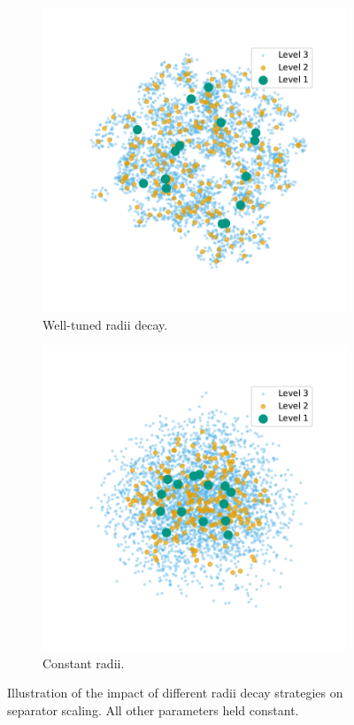 \begin{figure}[tbhp]
\begin{subfigure}{0.3\linewidth}
		\includegraphics[width=\linewidth]{graphics/good.pdf}
		\caption{Well-tuned radii decay.}
		\label{fig:radius_good}
	\end{subfigure}
	\hfill
	\begin{subfigure}{0.3\linewidth}
		\centering
		\includegraphics[width=\linewidth]{graphics/const.pdf}
		\caption{Constant radii.}
		\label{fig:radius_const}
	\end{subfigure}
	\caption{Illustration of the impact of different radii decay strategies on separator scaling. All other parameters held constant.}
	\label{fig:radius_compare}
\end{figure}

